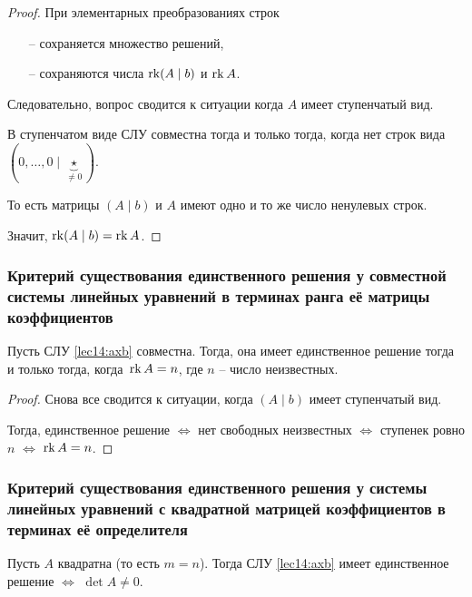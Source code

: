 \begin{proof}
    При элементарных преобразованиях строк
    \begin{itemize}[nosep]
        \item[--] сохраняется множество решений,
        \item[--] сохраняются числа $\operatorname{\mathop{\mathrm{rk}}} (A \mid b)$ и $\operatorname{\mathop{\mathrm{rk}}} A$.
    \end{itemize}

    \bigskip
    Следовательно, вопрос сводится к ситуации когда $A$ имеет ступенчатый вид.
    
    В ступенчатом виде СЛУ совместна тогда и только тогда, когда нет строк вида $(0, \dots, 0 \mid \underbrace{\star}_{\neq 0})$.

    То есть матрицы $(A \mid b)$ и $A$ имеют одно и то же число ненулевых строк.

    Значит, $\operatorname{\mathop{\mathrm{rk}}} (A \mid b) = \operatorname{\mathop{\mathrm{rk}}} A$.
\end{proof}


\subsubsection{Критерий существования единственного решения у совместной системы линейных уравнений в терминах ранга её матрицы коэффициентов}

\begin{theorem}
    Пусть СЛУ \eqref{lec14:axb} совместна. Тогда, она имеет единственное решение тогда и только тогда, когда~$\operatorname{\mathop{\mathrm{rk}}} A = n$, где $n$ -- число неизвестных.
\end{theorem}

\begin{proof}
    Снова все сводится к ситуации, когда $(A \mid b)$ имеет ступенчатый вид.

    Тогда, единственное решение $\iff$ нет свободных неизвестных $\iff$ ступенек ровно $n$ $\iff$ $\operatorname{\mathop{\mathrm{rk}}} A = n$.
\end{proof}


\subsubsection{Критерий существования единственного решения у системы линейных уравнений с квадратной матрицей коэффициентов в терминах её определителя}

\begin{corollary}
    Пусть $A$ квадратна (то есть $m = n$). Тогда СЛУ \eqref{lec14:axb} имеет единственное решение $\iff$ $\det A \neq 0$.
\end{corollary}

